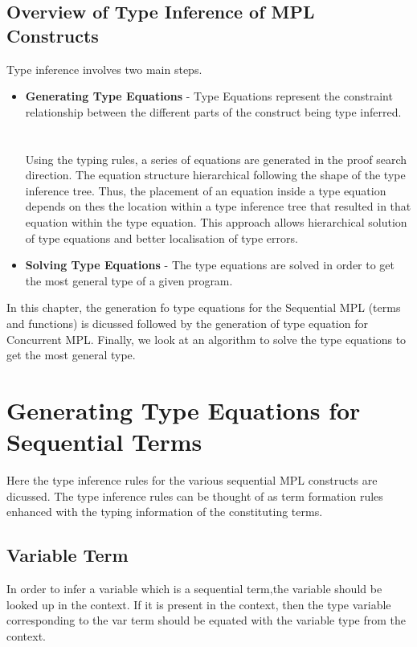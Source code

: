 \documentclass[11pt]{article}
\begin{document}
\subsection {Overview of Type Inference of MPL Constructs}
Type inference involves two main steps. 
\begin {itemize}
\item {\bf Generating Type Equations} - Type Equations represent the constraint relationship between the different parts of the construct being type inferred. 
~~\\~~\\
Using the typing rules, a series of equations are generated in the proof search direction. The equation structure hierarchical following the shape of the type inference tree. Thus, the placement of an equation inside a type equation depends on thes the location within a type inference tree that resulted in that equation within the type equation. This approach allows hierarchical solution of type equations and better localisation of type errors.     
\item {\bf Solving Type Equations} - The type equations are solved in order to get the most general type of a given program.
\end{itemize}
In this chapter, the generation fo type equations for the Sequential MPL (terms and functions) is dicussed followed by the generation of type equation for Concurrent MPL. Finally, we look at an algorithm to solve the type equations to get the most general type.

\section {Generating Type Equations for Sequential Terms }
Here the type inference rules for the various sequential MPL constructs are dicussed. The type inference rules can be thought of as term formation rules enhanced with the typing information of the constituting terms.
\subsection {Variable Term}
In order to infer a variable which is a sequential term,the variable should be looked up in the context. If it is present in the context, then the type variable corresponding to the var term should be equated with the variable type from the context.
~~\\~~\\
\begin{mdframed} [style=MyFrame,userdefinedwidth=8cm,align=center,
                  frametitle=Typing rule for variable ,frametitlerule=true,
                  frametitlerulewidth = 1pt
                 ]
  { 
  }
\end{mdframed}
~~\\~~\\
\end{document}
